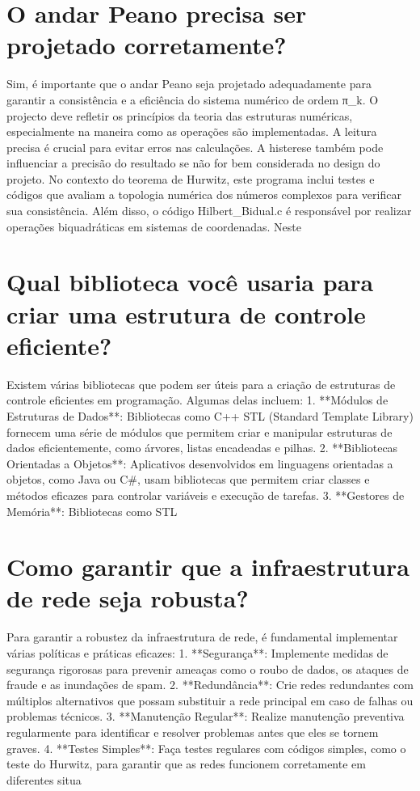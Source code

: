 \documentclass[11pt,a4paper]{article}
\begin{document}
\section{O andar Peano precisa ser projetado corretamente?}
Sim, é importante que o andar Peano seja projetado adequadamente para garantir a consistência e a eficiência do sistema numérico de ordem π\_k. O projecto deve refletir os princípios da teoria das estruturas numéricas, especialmente na maneira como as operações são implementadas. A leitura precisa é crucial para evitar erros nas calculações. A histerese também pode influenciar a precisão do resultado se não for bem considerada no design do projeto. No contexto do teorema de Hurwitz, este programa inclui testes e códigos que avaliam a topologia numérica dos números complexos para verificar sua consistência. Além disso, o código Hilbert\_Bidual.c é responsável por realizar operações biquadráticas em sistemas de coordenadas. Neste

\section{Qual biblioteca você usaria para criar uma estrutura de controle eficiente?}
Existem várias bibliotecas que podem ser úteis para a criação de estruturas de controle eficientes em programação. Algumas delas incluem: 1. **Módulos de Estruturas de Dados**: Bibliotecas como C++ STL (Standard Template Library) fornecem uma série de módulos que permitem criar e manipular estruturas de dados eficientemente, como árvores, listas encadeadas e pilhas. 2. **Bibliotecas Orientadas a Objetos**: Aplicativos desenvolvidos em linguagens orientadas a objetos, como Java ou C\#, usam bibliotecas que permitem criar classes e métodos eficazes para controlar variáveis e execução de tarefas. 3. **Gestores de Memória**: Bibliotecas como STL

\section{Como garantir que a infraestrutura de rede seja robusta?}
Para garantir a robustez da infraestrutura de rede, é fundamental implementar várias políticas e práticas eficazes: 1. **Segurança**: Implemente medidas de segurança rigorosas para prevenir ameaças como o roubo de dados, os ataques de fraude e as inundações de spam. 2. **Redundância**: Crie redes redundantes com múltiplos alternativos que possam substituir a rede principal em caso de falhas ou problemas técnicos. 3. **Manutenção Regular**: Realize manutenção preventiva regularmente para identificar e resolver problemas antes que eles se tornem graves. 4. **Testes Simples**: Faça testes regulares com códigos simples, como o teste do Hurwitz, para garantir que as redes funcionem corretamente em diferentes situa
\end{document}
